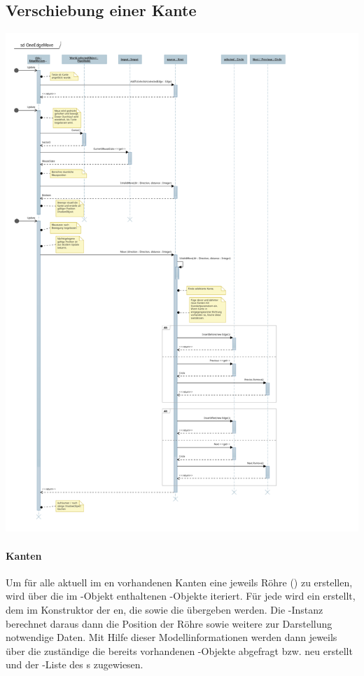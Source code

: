 \subsection{Verschiebung einer Kante}
\includegraphics[scale=0.8]{Sequenzdiagram_OnEdgeMove.pdf}

\paragraph{Kanten}

Um für alle aktuell im en vorhandenen Kanten eine jeweils Röhre () zu erstellen, wird über die im -Objekt enthaltenen -Objekte iteriert. Für jede  wird ein  erstellt, dem im Konstruktor der en, die  sowie die  übergeben werden. Die -Instanz berechnet daraus dann die Position der Röhre sowie weitere zur Darstellung notwendige Daten. Mit Hilfe dieser Modellinformationen werden dann jeweils über die zuständige  die bereits vorhandenen -Objekte abgefragt bzw. neu erstellt und der -Liste des s zugewiesen.

